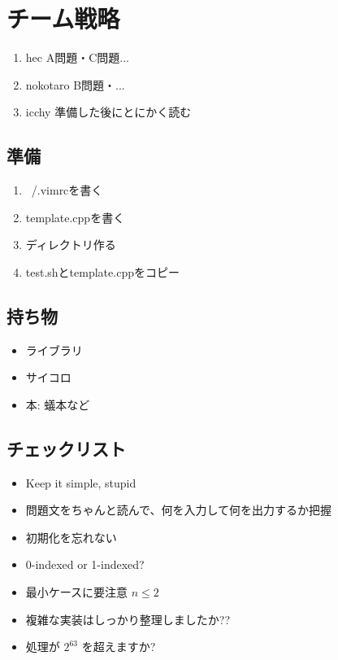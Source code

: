 \section{チーム戦略}

\begin{enumerate}
\setlength{\parskip}{0cm} %
\setlength{\itemsep}{0cm} %
\item hec A問題・C問題...
\item nokotaro B問題・...
\item icchy 準備した後にとにかく読む
\end{enumerate}

\subsection{準備}
\begin{enumerate}
\setlength{\parskip}{0cm} %
\setlength{\itemsep}{0cm} %
\item  ~/.vimrcを書く
\item template.cppを書く
\item ディレクトリ作る
\item test.shとtemplate.cppをコピー
\end{enumerate}

\subsection{持ち物}
\begin{itemize}
\setlength{\parskip}{0cm} %
\setlength{\itemsep}{0cm} %
\item ライブラリ
\item サイコロ
\item 本: 蟻本など
\end{itemize}


\subsection{チェックリスト}
\begin{itemize}
\setlength{\parskip}{0cm} %
\setlength{\itemsep}{0cm} %
\item Keep it simple, stupid
\item 問題文をちゃんと読んで、何を入力して何を出力するか把握
\item 初期化を忘れない
\item 0-indexed or 1-indexed?
\item 最小ケースに要注意 $n\le2$
\item 複雑な実装はしっかり整理しましたか??
\item 処理が $2^{63}$ を超えますか?
\end{itemize}

